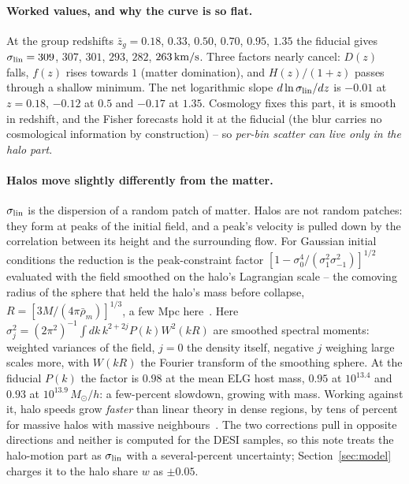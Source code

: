 \documentclass[11pt]{article}
\newcommand{\slin}{\sigma_{\rm lin}}
\newcommand{\Msun}{M_\odot}
\newcommand{\kms}{\,{\rm km/s}}
\begin{document}
\paragraph{Worked values, and why the curve is so flat.}
At the group redshifts $\bar{z}_g = 0.18$, $0.33$, $0.50$, $0.70$,
$0.95$, $1.35$ the fiducial gives $\slin = 309$, $307$, $301$, $293$,
$282$, $263\kms$.  Three factors nearly cancel: $D(z)$ falls, $f(z)$
rises towards $1$ (matter domination), and $H(z)/(1+z)$ passes
through a shallow minimum.  The net logarithmic slope
$d\ln\slin/dz$ is $-0.01$ at $z = 0.18$, $-0.12$ at $0.5$ and
$-0.17$ at $1.35$.  Cosmology fixes this part, it is smooth in
redshift, and the Fisher forecasts hold it at the fiducial (the blur
carries no cosmological information by construction) -- so
\emph{per-bin scatter can live only in the halo part}.

\paragraph{Halos move slightly differently from the matter.}
$\slin$ is the dispersion of a random patch of matter.  Halos are not
random patches: they form at peaks of the initial field, and a peak's
velocity is pulled down by the correlation between its height and the
surrounding flow.  For Gaussian initial conditions the reduction is
the peak-constraint factor $[1 - \sigma_0^4/(\sigma_1^2
\sigma_{-1}^2)]^{1/2}$ evaluated with the field smoothed on the halo's
Lagrangian scale -- the comoving radius of the sphere that held the
halo's mass before collapse, $R = [3M/(4\pi\bar{\rho}_m)]^{1/3}$, a
few Mpc here~\cite{BBKS1986, ShethDiaferio2001}.  Here
$\sigma_j^2 = (2\pi^2)^{-1}\!\int\!dk\,k^{2+2j}P(k)W^2(kR)$ are
smoothed spectral moments: weighted variances of the field, $j = 0$
the density itself, negative $j$ weighing large scales more, with
$W(kR)$ the Fourier transform of the smoothing sphere.  At the fiducial $P(k)$ the factor is
$0.98$ at the mean ELG host mass, $0.95$ at $10^{13.4}$ and $0.93$ at
$10^{13.9}\,\Msun/h$: a few-percent slowdown, growing with mass.
Working against it, halo speeds grow \emph{faster} than linear theory
in dense regions, by tens of percent for massive halos with massive
neighbours~\cite{ShethDiaferio2001}.  The two corrections pull in
opposite directions and neither is computed for the DESI samples, so
this note treats the halo-motion part as $\slin$ with a
several-percent uncertainty; Section~\ref{sec:model} charges it to
the halo share $w$ as $\pm 0.05$.
\end{document}
